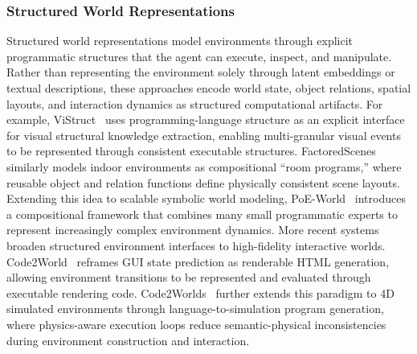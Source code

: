 \documentclass{llmxive}
\begin{document}
\subsubsection{Structured World Representations}
Structured world representations model environments through
explicit programmatic structures that the agent can execute,
inspect, and manipulate.
Rather than representing the environment solely through latent
embeddings or textual descriptions, these approaches encode world
state, object relations, spatial layouts, and interaction
dynamics as structured computational artifacts.
For example, ViStruct~\cite{chen2023vistruct} uses
programming-language structure as an explicit interface for
visual structural knowledge extraction, enabling multi-granular
visual events to be represented through consistent executable
structures.
FactoredScenes~\cite{hsu2025programs} similarly models indoor
environments as compositional ``room programs,'' where reusable
object and relation functions define physically consistent scene
layouts.
Extending this idea to scalable symbolic world modeling,
PoE-World~\cite{piriyakulkij2025poe} introduces a compositional
framework that combines many small programmatic experts to
represent increasingly complex environment dynamics.
More recent systems broaden structured environment interfaces to
high-fidelity interactive worlds.
Code2World~\cite{zheng2026code2world} reframes GUI state
prediction as renderable HTML generation, allowing environment
transitions to be represented and evaluated through executable
rendering code.
Code2Worlds~\cite{zhang2026code2worlds} further extends this
paradigm to 4D simulated environments through language-to-simulation
program generation, where physics-aware execution loops
reduce semantic-physical inconsistencies during environment
construction and interaction.
\end{document}
